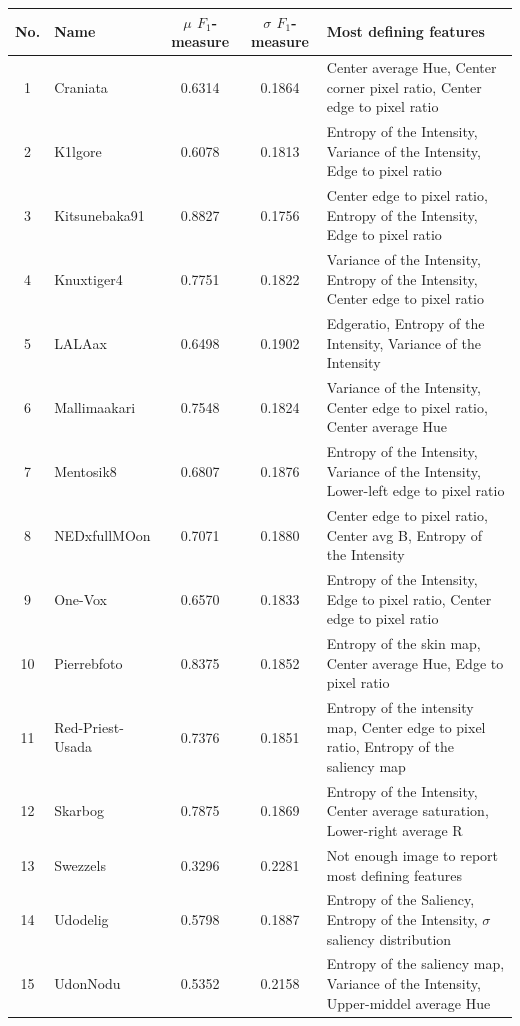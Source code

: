 \begin{table}[htb]
    \centering
    \begin{tabular}
        { | c | l | c | c | l | } 
        \hline
        No. & Name & $\mu$ $F_1$-measure & $\sigma$ $F_1$-measure & Most defining features\\
    \hline
    1 & Craniata &  0.6314 & 0.1864 & Center average Hue, Center corner pixel ratio, Center edge to pixel ratio\\
    2 & K1lgore & 0.6078 & 0.1813 & Entropy of the Intensity, Variance of the Intensity, Edge to pixel ratio \\
    3 & Kitsunebaka91 & 0.8827 & 0.1756 & Center edge to pixel ratio, Entropy of the Intensity, Edge to pixel ratio \\
    4 & Knuxtiger4 & 0.7751 & 0.1822 & Variance of the Intensity, Entropy of the Intensity, Center edge to pixel ratio \\
    5 & LALAax & 0.6498 & 0.1902 & Edgeratio, Entropy of the Intensity, Variance of the Intensity \\
    6 & Mallimaakari & 0.7548 & 0.1824 & Variance of the Intensity, Center edge to pixel ratio, Center average Hue\\
    7 & Mentosik8 & 0.6807 & 0.1876 & Entropy of the Intensity, Variance of the Intensity, Lower-left edge to pixel ratio \\ 
    8 & NEDxfullMOon & 0.7071 & 0.1880 & Center edge to pixel ratio, Center avg B, Entropy of the Intensity\\
    9 & One-Vox & 0.6570 & 0.1833 & Entropy of the Intensity, Edge to pixel ratio, Center edge to pixel ratio  \\
    10 & Pierrebfoto & 0.8375 & 0.1852 & Entropy of the skin map, Center average Hue, Edge to pixel ratio\\
    11 & Red-Priest-Usada & 0.7376 & 0.1851 & Entropy of the intensity map, Center edge to pixel ratio, Entropy of the saliency map\\
    12 & Skarbog & 0.7875 & 0.1869 & Entropy of the Intensity, Center average saturation, Lower-right average R \\
    13 & Swezzels & 0.3296 & 0.2281 & Not enough image to report most defining features \\ 
    14 & Udodelig & 0.5798 & 0.1887 & Entropy of the Saliency, Entropy of the Intensity, $\sigma$ saliency distribution \\
    15 & UdonNodu & 0.5352 & 0.2158 & Entropy of the saliency map, Variance of the Intensity, Upper-middel average Hue \\ 

\end{tabular}
\end{table}
